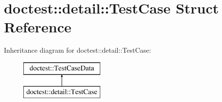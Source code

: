 \hypertarget{structdoctest_1_1detail_1_1_test_case}{}\section{doctest\+::detail\+::Test\+Case Struct Reference}
\label{structdoctest_1_1detail_1_1_test_case}
Inheritance diagram for doctest\+::detail\+::Test\+Case\+:\begin{figure}[H]
\begin{center}
\leavevmode
\includegraphics[height=2.000000cm]{structdoctest_1_1detail_1_1_test_case}
\end{center}
\end{figure}
